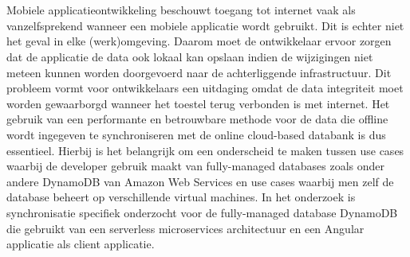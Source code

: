 



\chapter*{}

Mobiele applicatieontwikkeling beschouwt toegang tot internet vaak als vanzelfsprekend wanneer een mobiele applicatie wordt gebruikt. Dit is echter niet het geval in elke (werk)omgeving. Daarom moet de ontwikkelaar ervoor zorgen dat de applicatie de data ook lokaal kan opslaan indien de wijzigingen niet meteen kunnen worden doorgevoerd naar de achterliggende infrastructuur. Dit probleem vormt voor ontwikkelaars een uitdaging omdat de data integriteit moet worden gewaarborgd wanneer het toestel terug verbonden is met internet. Het gebruik van een performante en betrouwbare methode voor de data die offline wordt ingegeven te synchroniseren met de online cloud-based databank is dus essentieel. Hierbij is het belangrijk om een onderscheid te maken tussen use cases waarbij de developer gebruik maakt van fully-managed databases zoals onder andere DynamoDB van Amazon Web Services en use cases waarbij men zelf de database beheert op verschillende virtual machines. In het onderzoek is synchronisatie specifiek onderzocht voor de fully-managed database DynamoDB die gebruikt van een serverless microservices architectuur en een Angular applicatie als client applicatie. 

